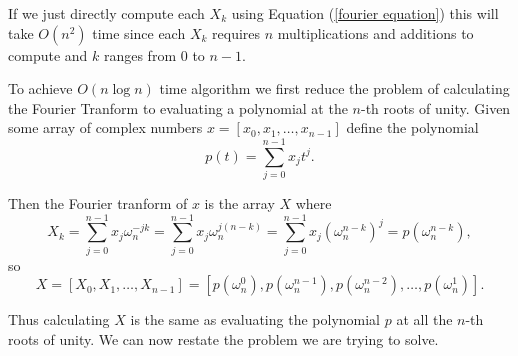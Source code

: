 \documentclass[12pt]{article}
\begin{document}
If we just directly compute each $X_k$ using Equation (\ref{fourier equation}) this will take $O(n^2)$ time since each $X_k$ requires $n$ multiplications and additions to compute and $k$ ranges from 0 to $n-1$.


To achieve $O(n\log n)$ time algorithm we first reduce the problem of calculating the Fourier Tranform to evaluating a polynomial at the $n$-th roots of unity.
Given some array of complex numbers $x = [x_0, x_1, \dots , x_{n-1}]$ define the polynomial
\[
    p(t) = \sum_{j=0}^{n-1} x_jt^j.
\]

Then the Fourier tranform of $x$ is the array $X$ where
\[
    X_k
    = \sum_{j = 0}^{n-1} x_j\omega_n^{-jk}
    = \sum_{j = 0}^{n-1} x_j\omega_n^{j(n-k)}
    = \sum_{j = 0}^{n-1} x_j(\omega_n^{n-k})^j
    =p(\omega_n^{n-k}),
\]
so
\[
    X = [X_0, X_1, \dots , X_{n-1}] = [p(\omega_n^0), p(\omega_n^{n-1}), p(\omega_n^{n-2}),\dots , p(\omega_n^{1})].
\]

Thus calculating $X$ is the same as evaluating the polynomial $p$ at all the $n$-th roots of unity.
We can now restate the problem we are trying to solve.
\end{document}
